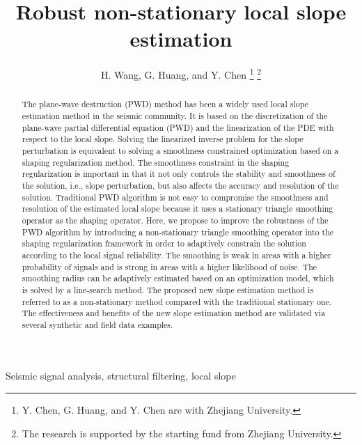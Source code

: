 \title{Robust non-stationary local slope estimation}
\renewcommand{\thefootnote}{\fnsymbol{footnote}}
\author{H. Wang, G. Huang, and Y. Chen
\thanks{Y. Chen, G. Huang, and Y. Chen are with Zhejiang University.}
\thanks{The research is supported by the starting fund from Zhejiang University.}}
\maketitle

\DeclareRobustCommand{\old}[1]{}
\DeclareRobustCommand{\new}[1]{#1}
\DeclareRobustCommand{\dlo}[1]{}
\DeclareRobustCommand{\wen}[1]{#1}

\begin{abstract}
The plane-wave destruction (PWD) method has been a widely used local slope estimation method in the seismic community. It is based on the discretization of the plane-wave partial differential equation (PWD) and the linearization of the PDE with respect to the local slope. Solving the linearized inverse problem for the slope perturbation is equivalent to solving a smoothness constrained optimization based on a shaping regularization method. The smoothness constraint in the shaping regularization is important in that it not only controls the stability and smoothness of the solution, i.e., slope perturbation, but also affects the accuracy and resolution of the solution. Traditional PWD algorithm is not easy to compromise the smoothness and resolution of the estimated local slope because it uses a stationary triangle smoothing operator as the shaping operator. Here, we propose to improve the robustness of the PWD algorithm by introducing a non-stationary triangle smoothing operator into the shaping regularization framework in order to adaptively constrain the solution according to the local signal reliability. The smoothing is weak in areas with a higher probability of signals and is strong in areas with a higher likelihood of noise. The smoothing radius can be adaptively estimated based on an optimization model, which is solved by a line-search method. The proposed new slope estimation method is referred to as a non-stationary method compared with the traditional stationary one. The effectiveness and benefits of the new slope estimation method are validated via several synthetic and field data examples.
\end{abstract}

\begin{keywords}
Seismic signal analysis, structural filtering, local slope
\end{keywords}

